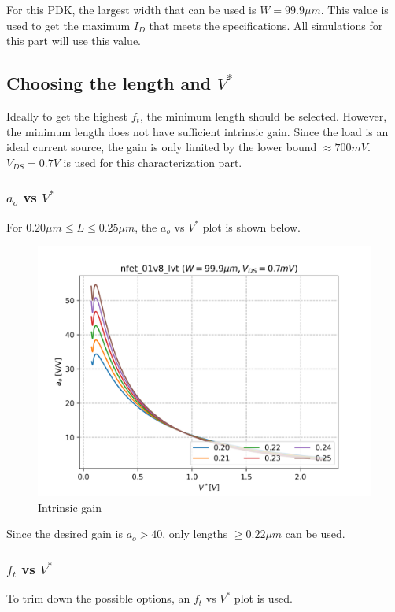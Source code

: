 \documentclass[conference]{IEEEtran}
\begin{document}
\vspace{8pt}
For this PDK, the largest width that can be used is $W=99.9\mu m$. This value is used to get the maximum $I_D$ that meets the specifications. All simulations for this part will use this value. 

\subsection{Choosing the length and $V^*$}
Ideally to get the highest $f_t$, the minimum length should be selected. However, the minimum length does not have sufficient intrinsic gain. Since the load is an ideal current source, the gain is only limited by the lower bound $\approx 700mV$. $V_{DS}=0.7V$ is used for this characterization part. 

\vspace{8pt}
\subsubsection{$a_o$ vs $V^*$} 
For $0.20\mu m \leq L \leq 0.25\mu m$, the $a_o$ vs $V^*$ plot is shown below. 
\begin{figure}[H]
	\centering 
	\includegraphics[width=\columnwidth]{vstar-ao-maxft.png}
	\caption{Intrinsic gain}
	\label{vstar-ao-2}	
\end{figure}
Since the desired gain is $a_o > 40$, only lengths $\geq 0.22\mu m$ can be used. 

\vspace{8pt}
\subsubsection{$f_t$ vs $V^*$} 
To trim down the possible options, an $f_t$ vs $V^*$ plot is used. 
 
\end{document}
